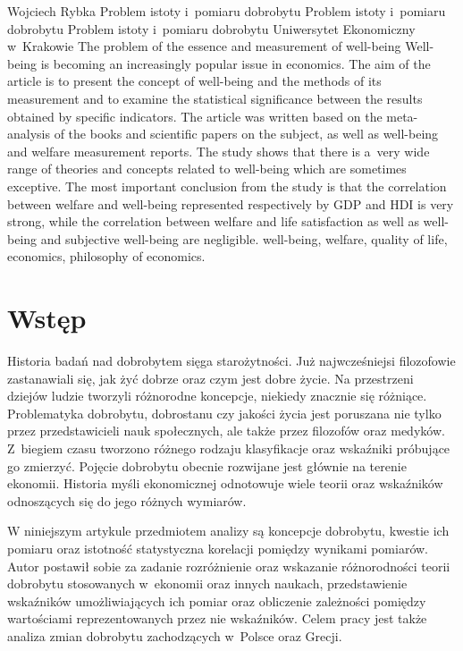\begin{artplenv}{Wojciech Rybka}
	{Problem istoty i~pomiaru dobrobytu}
	{Problem istoty i~pomiaru dobrobytu}
	{Problem istoty i~pomiaru dobrobytu}
	{Uniwersytet Ekonomiczny w~Krakowie}
	{The problem of the essence and measurement of well-being}
	{Well-being is becoming an increasingly popular issue in economics. The aim of the article is to present the concept of well-being and the methods of its measurement and to examine the statistical significance between the results obtained by specific indicators. The article was written based on the meta-analysis of the books and scientific papers on the subject, as well as well-being and welfare measurement reports. The study shows that there is a~very wide range of theories and concepts related to well-being which are sometimes exceptive. The most important conclusion from the study is that the correlation between welfare and well-being represented respectively by GDP and HDI is very strong, while the correlation between welfare and life satisfaction as well as well-being and subjective well-being are negligible.}
	{well-being, welfare, quality of life, economics, philosophy of economics.}



\section*{Wstęp}
\lettrine[loversize=0.13,lines=2,lraise=-0.05,nindent=0em,findent=0.2pt]%
{H}{}istoria badań nad dobrobytem sięga starożytności. Już najwcześniejsi filozofowie zastanawiali się, jak żyć dobrze oraz
czym jest dobre życie. Na przestrzeni dziejów ludzie tworzyli różnorodne koncepcje, niekiedy znacznie się różniące.
Problematyka dobrobytu, dobrostanu czy jakości życia jest poruszana nie tylko przez przedstawicieli nauk społecznych,
ale także przez filozofów oraz medyków. Z~biegiem czasu tworzono różnego rodzaju klasyfikacje oraz wskaźniki próbujące
go zmierzyć. Pojęcie dobrobytu obecnie rozwijane jest głównie na terenie ekonomii. Historia myśli ekonomicznej
odnotowuje wiele teorii oraz wskaźników odnoszących się do jego różnych wymiarów.

W niniejszym artykule przedmiotem analizy są koncepcje dobrobytu, kwestie ich pomiaru oraz istotność statystyczna
korelacji pomiędzy wynikami pomiarów. Autor postawił sobie za zadanie rozróżnienie oraz wskazanie różnorodności teorii
dobrobytu stosowanych w~ekonomii oraz innych naukach, przedstawienie wskaźników umożliwiających ich pomiar oraz
obliczenie zależności pomiędzy wartościami reprezentowanych przez nie wskaźników. Celem pracy jest także analiza zmian
dobrobytu zachodzących w~Polsce oraz Grecji. 


\end{artplenv}
